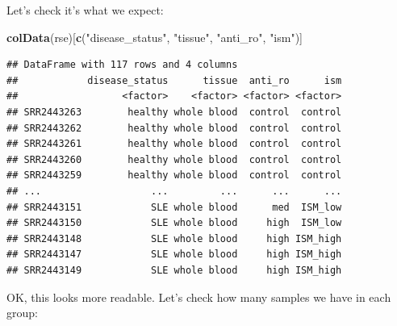 \documentclass[9pt,a4paper,]{extarticle}
\newenvironment{Shaded}{\begin{snugshade}}{\end{snugshade}}
\newcommand{\KeywordTok}[1]{\textcolor[rgb]{0.13,0.29,0.53}{\textbf{#1}}}
\newcommand{\DecValTok}[1]{\textcolor[rgb]{0.00,0.00,0.81}{#1}}
\newcommand{\StringTok}[1]{\textcolor[rgb]{0.31,0.60,0.02}{#1}}
\newcommand{\CommentTok}[1]{\textcolor[rgb]{0.56,0.35,0.01}{\textit{#1}}}
\newcommand{\OperatorTok}[1]{\textcolor[rgb]{0.81,0.36,0.00}{\textbf{#1}}}
\newcommand{\NormalTok}[1]{#1}
\begin{document}
\begin{Shaded}
\begin{Highlighting}[]
\KeywordTok{colData}\NormalTok{(rse)}\OperatorTok{$}\NormalTok{anti_ro <-}\StringTok{ }\KeywordTok{factor}\NormalTok{(}\KeywordTok{colData}\NormalTok{(rse)}\OperatorTok{$}\NormalTok{anti_ro)}
\CommentTok{# ism}
\KeywordTok{colData}\NormalTok{(rse)}\OperatorTok{$}\NormalTok{ism <-}\StringTok{ }\KeywordTok{sapply}\NormalTok{(}\KeywordTok{colData}\NormalTok{(rse)}\OperatorTok{$}\NormalTok{characteristics, }\StringTok{"["}\NormalTok{, }\DecValTok{4}\NormalTok{)}
\KeywordTok{colData}\NormalTok{(rse)}\OperatorTok{$}\NormalTok{ism <-}\KeywordTok{sub}\NormalTok{(}\StringTok{"ism: "}\NormalTok{, }\StringTok{""}\NormalTok{, }\KeywordTok{colData}\NormalTok{(rse)}\OperatorTok{$}\NormalTok{ism)}
\KeywordTok{colData}\NormalTok{(rse)}\OperatorTok{$}\NormalTok{ism <-}\StringTok{ }\KeywordTok{factor}\NormalTok{(}\KeywordTok{colData}\NormalTok{(rse)}\OperatorTok{$}\NormalTok{ism)}
\end{Highlighting}
\end{Shaded}

Let's check it's what we expect:

\begin{Shaded}
\begin{Highlighting}[]
\KeywordTok{colData}\NormalTok{(rse)[}\KeywordTok{c}\NormalTok{(}\StringTok{"disease_status"}\NormalTok{, }\StringTok{"tissue"}\NormalTok{, }\StringTok{"anti_ro"}\NormalTok{, }\StringTok{"ism"}\NormalTok{)]}
\end{Highlighting}
\end{Shaded}

\begin{verbatim}
## DataFrame with 117 rows and 4 columns
##            disease_status      tissue  anti_ro      ism
##                  <factor>    <factor> <factor> <factor>
## SRR2443263        healthy whole blood  control  control
## SRR2443262        healthy whole blood  control  control
## SRR2443261        healthy whole blood  control  control
## SRR2443260        healthy whole blood  control  control
## SRR2443259        healthy whole blood  control  control
## ...                   ...         ...      ...      ...
## SRR2443151            SLE whole blood      med  ISM_low
## SRR2443150            SLE whole blood     high  ISM_low
## SRR2443148            SLE whole blood     high ISM_high
## SRR2443147            SLE whole blood     high ISM_high
## SRR2443149            SLE whole blood     high ISM_high
\end{verbatim}

OK, this looks more readable.
Let's check how many samples we have in each group:
\end{document}
